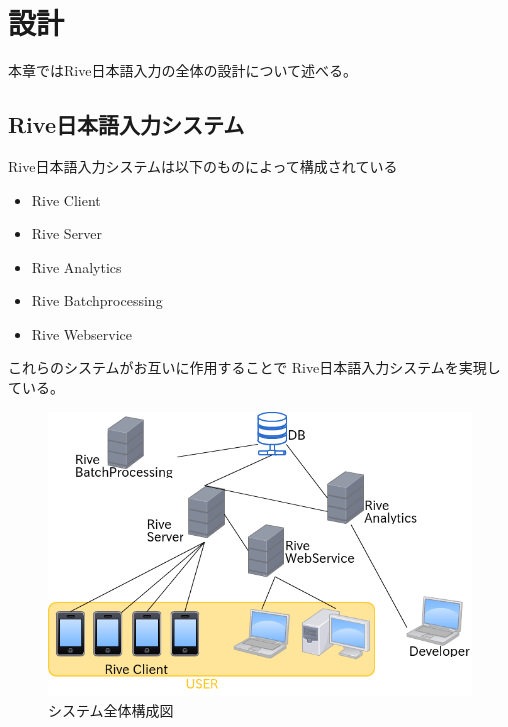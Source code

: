 \chapter{設計}
\label{chap:design}
本章ではRive日本語入力の全体の設計について述べる。

\newpage
\section{Rive日本語入力システム}
Rive日本語入力システムは以下のものによって構成されている
\begin{itemize}
  \item Rive Client
  \item Rive Server
  \item Rive Analytics
  \item Rive Batchprocessing
  \item Rive Webservice
\end{itemize}
これらのシステムがお互いに作用することで
Rive日本語入力システムを実現している。
\begin{figure}[htbp]
  \begin{center}
    \includegraphics[width=12cm,bb=0 0 540 448]{images/systemstructure.png}
  \end{center}
  \caption{システム全体構成図}
  \label{fig:systemstructure}
\end{figure}

